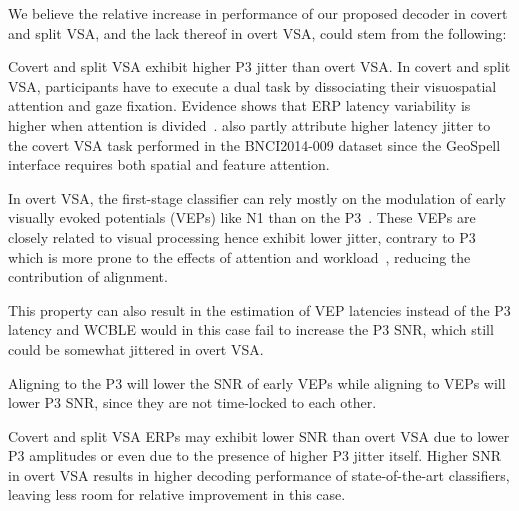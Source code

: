 We believe the relative increase in performance of our proposed decoder in covert and
split VSA, and the lack thereof in overt VSA, could stem from the following:
\begin{enumerate*}[label=(\arabic*)]
	\item Covert and split VSA exhibit higher P3 jitter than overt VSA.
        In covert and split VSA, participants have to execute a dual task by
        dissociating their visuospatial attention and gaze fixation.
        Evidence shows that ERP latency variability is higher when attention is
        divided~\cite{Polich2007,Arico2014}.
        \cite{Arico2014} also partly attribute higher latency jitter to the covert VSA
        task performed in the BNCI2014-009 dataset since the GeoSpell interface
        requires both spatial and feature attention.
  \item In overt VSA, the first-stage classifier can rely mostly on the modulation
        of early visually evoked potentials (VEPs) like N1 than on the
        P3~\cite{Treder2010}.
        These VEPs are closely related to visual processing hence exhibit
        lower jitter, contrary to P3 which is more prone to the effects of
        attention and workload~\cite{Hu2010}, reducing the contribution of
        alignment.
  \item This property can also result in the estimation of VEP latencies
        instead of the P3 latency and WCBLE would in this case fail to
        increase the P3 SNR, which still could be somewhat jittered in overt
        VSA.
  \item Aligning to the P3 will lower the SNR of early VEPs while aligning to
    VEPs will lower P3 SNR, since they are not time-locked to each other.
	\item Covert and split VSA ERPs may exhibit lower SNR than overt
        VSA due to lower P3 amplitudes or even due to the presence of higher P3
        jitter itself.
        Higher SNR in overt VSA results in higher decoding performance of
        state-of-the-art classifiers, leaving less room for relative improvement
        in this case.
\end{enumerate*}

